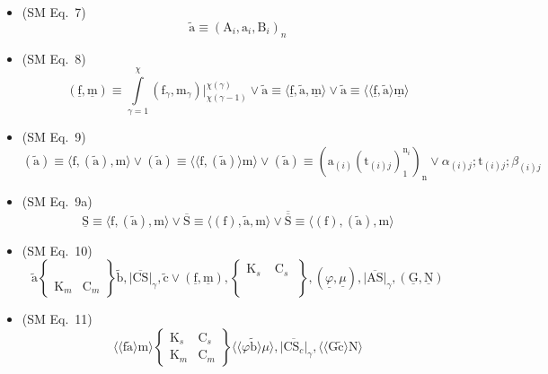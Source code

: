 \documentclass[
    12pt,              %
    a4paper,           %
    headings=normal,   %
    twoside=true,      %
    BCOR=8mm,          %
]{scrbook}
\begin{document}
\begin{itemize}[label={},leftmargin=0pt]
    \item (SM Eq.\ 7) 
    \[
    \tilde{\mathrm{a}} \equiv (\mathrm{A}_i, \mathrm{a}_i, \mathrm{B}_i)_n
    \]

    \item (SM Eq.\ 8) 
    \[
    (\underline{\mathrm{f}}, \underline{\mathrm{m}}) \equiv \int\limits_{\gamma=1}^\chi (\mathrm{f}_\gamma, \mathrm{m}_\gamma) \big|_{\chi(\gamma-1)}^{\chi(\gamma)} \lor \tilde{\mathrm{a}} \equiv \langle \underline{\mathrm{f}}, \tilde{\mathrm{a}}, \underline{\mathrm{m}} \rangle \lor \tilde{\mathrm{a}} \equiv \langle\langle \underline{\mathrm{f}}, \tilde{\mathrm{a}} \rangle \underline{\mathrm{m}} \rangle
    \]

    \item (SM Eq.\ 9) 
    \[
    (\tilde{\mathrm{a}}) \equiv \langle \mathrm{f}, (\tilde{\mathrm{a}}), \mathrm{m} \rangle \lor (\tilde{\mathrm{a}}) \equiv \langle\langle \mathrm{f}, (\tilde{\mathrm{a}}) \rangle \mathrm{m} \rangle \lor (\tilde{\mathrm{a}}) \equiv \left( \mathrm{a}_{(i)}(\mathrm{t}_{(i)j})_1^{\mathrm{n}_i} \right)_\mathrm{n} \lor \alpha_{(i)j} ; \mathrm{t}_{(i)j} ; \beta_{(i)j}
    \]

    \item (SM Eq.\ 9a) 
    \[
    \underline{\mathrm{S}} \equiv \langle \mathrm{f}, (\tilde{\mathrm{a}}), \mathrm{m} \rangle \lor \overline{\mathrm{S}} \equiv \langle (\mathrm{f}), \tilde{\mathrm{a}}, \mathrm{m} \rangle \lor \overline{\overline{\mathrm{S}}} \equiv \langle (\mathrm{f}), (\tilde{\mathrm{a}}), \mathrm{m} \rangle
    \]

    \item (SM Eq.\ 10) 
    \[
    \tilde{\mathrm{a}} \left\{ \begin{smallmatrix} \phantom{\mathrm{K}_s} & \phantom{\mathrm{C}_s} \\ \mathrm{K}_m & \mathrm{C}_m \end{smallmatrix} \right\} \tilde{\mathrm{b}}, \overline{\lvert\mathrm{CS}\rvert}_\gamma, \tilde{\mathrm{c}} \lor (\underline{\mathrm{f}}, \underline{\mathrm{m}}), \left\{ \begin{smallmatrix} \mathrm{K}_s & \mathrm{C}_s \\ \phantom{\mathrm{K}_m} & \phantom{\mathrm{C}_m} \end{smallmatrix} \right\}, (\underline{\varphi}, \underline{\mu}), \overline{\lvert\mathrm{AS}\rvert}_\gamma, (\underline{\mathrm{G}}, \underline{\mathrm{N}})
    \]

    \item (SM Eq.\ 11) 
    \[
    \langle\langle \mathrm{f} \tilde{\mathrm{a}} \rangle \mathrm{m} \rangle \left\{ \begin{smallmatrix} \mathrm{K}_s & \mathrm{C}_s \\ \mathrm{K}_m & \mathrm{C}_m \end{smallmatrix} \right\} \langle\langle \varphi \tilde{\mathrm{b}} \rangle \mu \rangle, \overline{|\mathrm{CS}_c|}_\gamma, \langle\langle \mathrm{G} \tilde{\mathrm{c}} \rangle \mathrm{N} \rangle
    \]


\end{itemize}
\end{document}

